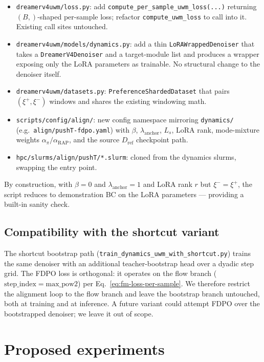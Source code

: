 \documentclass[11pt]{article}
\newcommand{\Dref}{D_{\mathrm{ref}}}
\begin{document}
\begin{itemize}
    \item \texttt{dreamerv4uwm/loss.py}: add \texttt{compute\_per\_sample\_uwm\_loss(...)} returning $(B,)$-shaped per-sample loss; refactor \texttt{compute\_uwm\_loss} to call into it. Existing call sites untouched.
    \item \texttt{dreamerv4uwm/models/dynamics.py}: add a thin \texttt{LoRAWrappedDenoiser} that takes a \texttt{DreamerV4Denoiser} and a target-module list and produces a wrapper exposing only the LoRA parameters as trainable. No structural change to the denoiser itself.
    \item \texttt{dreamerv4uwm/datasets.py}: \texttt{PreferenceShardedDataset} that pairs $(\xi^+, \xi^-)$ windows and shares the existing windowing math.
    \item \texttt{scripts/config/align/}: new config namespace mirroring \texttt{dynamics/} (e.g.\ \texttt{align/pushT-fdpo.yaml}) with $\beta$, $\lambda_{\mathrm{anchor}}$, $L_s$, LoRA rank, mode-mixture weights $\alpha_\pi/\alpha_{\mathrm{RAP}}$, and the source $\Dref$ checkpoint path.
    \item \texttt{hpc/slurms/align/pushT/*.slurm}: cloned from the dynamics slurms, swapping the entry point.
\end{itemize}

By construction, with $\beta = 0$ and $\lambda_{\mathrm{anchor}} = 1$ and LoRA rank $r$ but $\xi^- = \xi^+$, the script reduces to demonstration BC on the LoRA parameters --- providing a built-in sanity check.

\subsection{Compatibility with the shortcut variant}
\label{sec:shortcut-compat}

The shortcut bootstrap path (\texttt{train\_dynamics\_uwm\_with\_shortcut.py}) trains the same denoiser with an additional teacher-bootstrap head over a dyadic step grid. The FDPO loss is orthogonal: it operates on the flow branch ($\mathrm{step\_index} = \mathrm{max\_pow2}$) per Eq.~\eqref{eq:fm-loss-per-sample}. We therefore restrict the alignment loop to the flow branch and leave the bootstrap branch untouched, both at training and at inference. A future variant could attempt FDPO over the bootstrapped denoiser; we leave it out of scope.

\section{Proposed experiments}
\label{sec:experiments}
\end{document}
